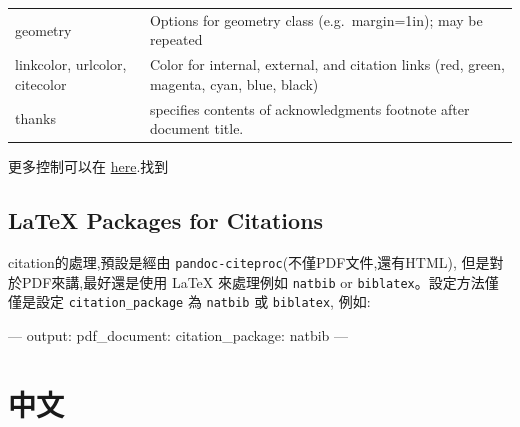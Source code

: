 \documentclass[]{book}
\newenvironment{Shaded}{\begin{snugshade}}{\end{snugshade}}
\newcommand{\OtherTok}[1]{\textcolor[rgb]{0.56,0.35,0.01}{#1}}
\newcommand{\FunctionTok}[1]{\textcolor[rgb]{0.00,0.00,0.00}{#1}}
\newcommand{\AttributeTok}[1]{\textcolor[rgb]{0.77,0.63,0.00}{#1}}
\theoremstyle{definition}
\theoremstyle{definition}
\theoremstyle{definition}
\theoremstyle{remark}
\begin{document}
\begin{longtable}[]{@{}ll@{}}
\begin{minipage}[t]{0.05\columnwidth}\raggedright\strut
geometry\strut
\end{minipage} & \begin{minipage}[t]{0.05\columnwidth}\raggedright\strut
Options for geometry class (e.g.~margin=1in); may be repeated\strut
\end{minipage}\tabularnewline
\begin{minipage}[t]{0.05\columnwidth}\raggedright\strut
linkcolor, urlcolor, citecolor\strut
\end{minipage} & \begin{minipage}[t]{0.05\columnwidth}\raggedright\strut
Color for internal, external, and citation links (red, green, magenta,
cyan, blue, black)\strut
\end{minipage}\tabularnewline
\begin{minipage}[t]{0.05\columnwidth}\raggedright\strut
thanks\strut
\end{minipage} & \begin{minipage}[t]{0.05\columnwidth}\raggedright\strut
specifies contents of acknowledgments footnote after document
title.\strut
\end{minipage}\tabularnewline
\bottomrule
\end{longtable}

更多控制可以在
\href{http://pandoc.org/MANUAL.html\#variables-for-latex}{here}.找到

\subsection{LaTeX Packages for
Citations}\label{latex-packages-for-citations}

citation的處理,預設是經由
\texttt{pandoc-citeproc}(不僅PDF文件,還有HTML),
但是對於PDF來講,最好還是使用 LaTeX 來處理例如 \texttt{natbib} or
\texttt{biblatex}。設定方法僅僅是設定 \texttt{citation\_package} 為
\texttt{natbib} 或 \texttt{biblatex}, 例如:

\begin{Shaded}
\begin{Highlighting}[]
\OtherTok{---}
\FunctionTok{output:}
  \FunctionTok{pdf_document:}
    \FunctionTok{citation_package:}\AttributeTok{ natbib}
\OtherTok{---}
\end{Highlighting}
\end{Shaded}

\section{中文}
\end{document}
